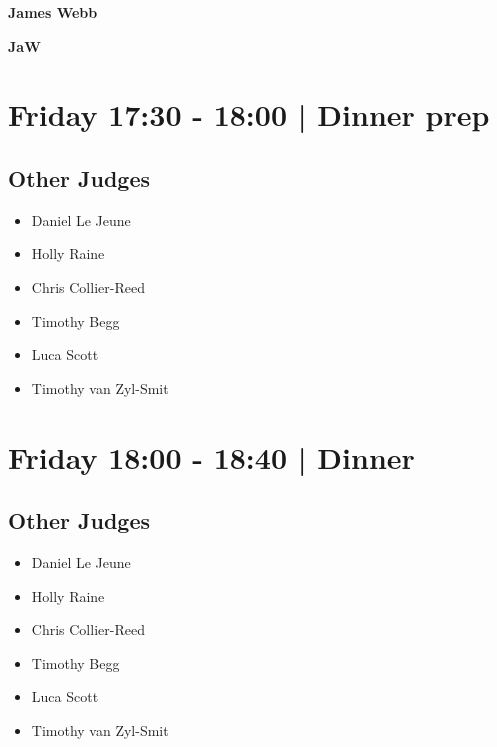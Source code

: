 \documentclass[10pt]{article}
\newcommand{\newtitle}[1]{\begin{center}{\Huge\bfseries #1 }\\ \vspace{5mm}\end{center}}
\newcommand{\newsubtitle}[1]{\begin{center}{\color{grey}\Large\bfseries #1 }\\ \vspace{5mm}\end{center}}
\begin{document}
    
	\clearpage

		\newtitle{James Webb}
	\newsubtitle{JaW}

            \section*{Friday 17:30
        -
        18:00
        |
         Dinner prep}
        
                
        \subsection*{Other Judges}
        
            \begin{itemize}
                            \item Daniel Le Jeune
                            \item Holly Raine
                            \item Chris Collier-Reed
                            \item Timothy Begg
                            \item Luca Scott
                            \item Timothy van Zyl-Smit
                        \end{itemize}
        

            \section*{Friday 18:00
        -
        18:40
        |
         Dinner }
        
                
        \subsection*{Other Judges}
        
            \begin{itemize}
                            \item Daniel Le Jeune
                            \item Holly Raine
                            \item Chris Collier-Reed
                            \item Timothy Begg
                            \item Luca Scott
                            \item Timothy van Zyl-Smit
                        \end{itemize}
        
\end{document}
